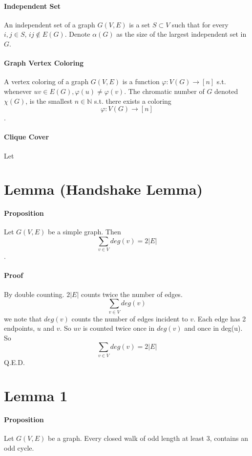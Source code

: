 \documentclass{article}
\begin{document}
\paragraph{Independent Set} An independent set of a graph $G(V,E)$ is a set $S \subset V$ such that for every $i,j \in S$, $ij \notin E(G)$. Denote $\alpha(G)$ as the size of the largest independent set in $G$.
\paragraph{Graph Vertex Coloring} A vertex coloring of a graph $G(V, E)$ is a function $\varphi : V(G) \rightarrow [n]$ s.t. whenever $uv\in E(G), \varphi(u) \neq \varphi(v)$. The chromatic number of $G$ denoted $\chi(G)$, is the smallest $n \in \mathbb{N}$ s.t. there exists a coloring $$\varphi:V(G)\rightarrow [n]$$. 
\paragraph{Clique Cover} Let


\section{Lemma (Handshake Lemma)}
\paragraph{Proposition} Let $G(V, E)$ be a simple graph. Then $$\sum_{v\in V}deg(v) = 2|E|$$.
\paragraph{Proof} By double counting. $2|E|$ counts twice the number of edges. $$\sum_{v\in V}deg(v)$$we note that $deg(v)$ counts the number of edges incident to $v$. Each edge has 2 endpoints, $u$ and $v$. So $uv$ is counted twice once in $deg(v)$ and once in deg(u). So  $$\sum_{v\in V}deg(v) = 2|E|$$ Q.E.D.

\section{Lemma 1}
\paragraph{Proposition} Let $G(V, E)$ be a graph. Every closed walk of odd length at least 3, contains an odd cycle.
\end{document}
